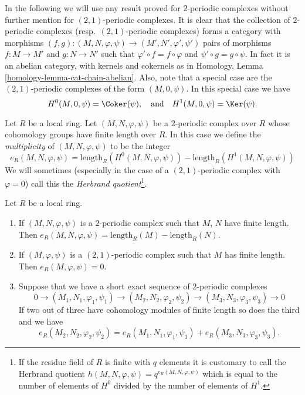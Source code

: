 \noindent
In the following we will use any result proved for $2$-periodic
complexes without further mention for $(2, 1)$-periodic complexes.
It is clear that the collection of $2$-periodic complexes
(resp.\ $(2, 1)$-periodic complexes) forms a category with morphisms
$(f, g) : (M, N, \varphi, \psi) \to (M', N', \varphi', \psi')$
pairs of morphisms $f : M \to M'$ and $g : N \to N'$ such
that $\varphi' \circ f = f \circ \varphi$ and $\psi' \circ g = g \circ \psi$.
In fact it is an abelian category, with kernels and cokernels as in
Homology, Lemma \ref{homology-lemma-cat-chain-abelian}.
Also, note that a special case are the
$(2, 1)$-periodic complexes of the form $(M, 0, \psi)$. In this
special case we have
$$
H^0(M, 0, \psi) = \Coker(\psi)
, \quad\text{and}\quad
H^1(M, 0, \psi) = \Ker(\psi).
$$

\begin{definition}
\label{definition-periodic-length}
Let $R$ be a local ring.
Let $(M, N, \varphi, \psi)$ be a $2$-periodic complex over $R$
whose cohomology groups have finite length over $R$.
In this case we define the {\it multiplicity} of $(M, N, \varphi, \psi)$
to be the integer
$$
e_R(M, N, \varphi, \psi) =
\text{length}_R(H^0(M, N, \varphi, \psi))
-
\text{length}_R(H^1(M, N, \varphi, \psi))
$$
We will sometimes (especially in the case of a $(2, 1)$-periodic complex with
$\varphi = 0$) call this the {\it Herbrand quotient}\footnote{If the residue
field of $R$ is finite with $q$ elements
it is customary to call the Herbrand quotient
$h(M, N, \varphi, \psi) = q^{e_R(M, N, \varphi, \psi)}$ which is equal to
the number of elements of $H^0$ divided by the number of elements of
$H^1$.}.
\end{definition}

\begin{lemma}
\label{lemma-periodic-length}
Let $R$ be a local ring.
\begin{enumerate}
\item If $(M, N, \varphi, \psi)$ is a $2$-periodic complex
such that $M$, $N$ have finite length. Then
$e_R(M, N, \varphi, \psi) = \text{length}_R(M) - \text{length}_R(N)$.
\item If $(M, \varphi, \psi)$ is a $(2, 1)$-periodic complex
such that $M$ has finite length. Then
$e_R(M, \varphi, \psi) = 0$.
\item Suppose that we have a short exact sequence of
$2$-periodic complexes
$$
0 \to (M_1, N_1, \varphi_1, \psi_1)
\to (M_2, N_2, \varphi_2, \psi_2)
\to (M_3, N_3, \varphi_3, \psi_3)
\to 0
$$
If two out of three have cohomology modules of finite length so does
the third and we have
$$
e_R(M_2, N_2, \varphi_2, \psi_2) =
e_R(M_1, N_1, \varphi_1, \psi_1) +
e_R(M_3, N_3, \varphi_3, \psi_3).
$$
\end{enumerate}
\end{lemma}

